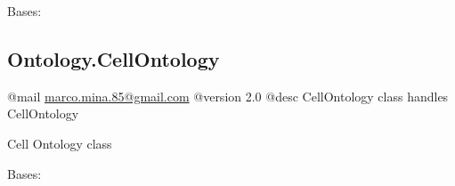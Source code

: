 \documentclass[letterpaper,10pt,english]{sphinxmanual}
\begin{document}
\begin{fulllineitems}
\label{fastsemsim.Ontology:fastsemsim.Ontology.GeneOntology.GeneOntology}
Bases: {\hyperref[fastsemsim.Ontology:fastsemsim.Ontology.Ontology.Ontology]{}}

\end{fulllineitems}



\subsection{Ontology.CellOntology}
\label{fastsemsim.Ontology:module-fastsemsim.Ontology.CellOntology}\label{fastsemsim.Ontology:ontology-cellontology}
@mail \href{mailto:marco.mina.85@gmail.com}{marco.mina.85@gmail.com}
@version 2.0
@desc CellOntology class handles CellOntology

Cell Ontology class

\begin{fulllineitems}
\label{fastsemsim.Ontology:fastsemsim.Ontology.CellOntology.CellOntology}
Bases: {\hyperref[fastsemsim.Ontology:fastsemsim.Ontology.Ontology.Ontology]{}}

\begin{fulllineitems}
\label{fastsemsim.Ontology:fastsemsim.Ontology.CellOntology.CellOntology.alt_ids}
\end{fulllineitems}


\begin{fulllineitems}
\label{fastsemsim.Ontology:fastsemsim.Ontology.CellOntology.CellOntology.obsolete_ids}
\end{fulllineitems}


\end{fulllineitems}
\end{document}
